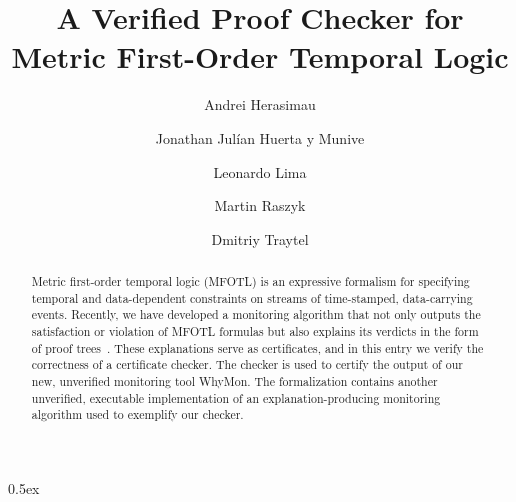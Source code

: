 \documentclass[10pt,a4paper]{article}
\begin{document}
\title{A Verified Proof Checker for Metric First-Order Temporal Logic}
\author{Andrei Herasimau \and Jonathan Jul\'{i}an Huerta y Munive \and Leonardo Lima \and Martin Raszyk \and Dmitriy Traytel}

\maketitle

\begin{abstract}
Metric first-order temporal logic (MFOTL) is an expressive formalism for specifying temporal and data-dependent constraints on streams of time-stamped, data-carrying events. Recently, we have developed a monitoring algorithm that not only outputs the satisfaction or violation of MFOTL formulas but also explains its verdicts in the form of proof trees~\cite{DBLP:conf/tacas/LimaHRTY23,DBLP:conf/tacas/LimaHT24}. These explanations serve as certificates, and in this entry we verify the correctness of a certificate checker. The checker is used to certify the output of our new, unverified monitoring tool WhyMon. The formalization contains another unverified, executable implementation of an explanation-producing monitoring algorithm used to exemplify our checker.
\end{abstract}

\tableofcontents

\parindent 0pt\parskip 0.5ex





\end{document}
